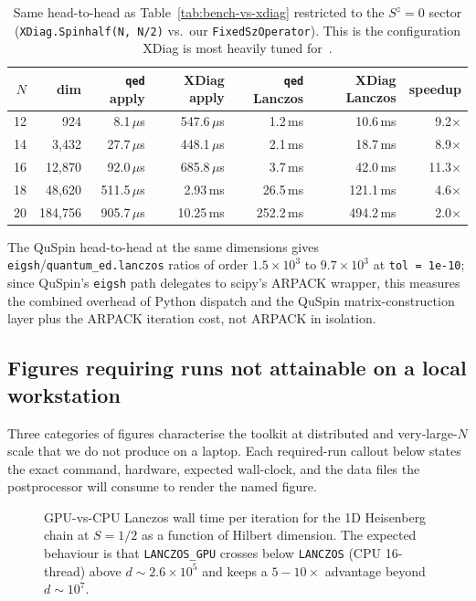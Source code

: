 \documentclass[submission, PhysCodeb]{SciPost}
\newcommand{\figureplaceholder}[2][0.85\textwidth]{%
  \begin{center}%
    \tikz[baseline]{
      \node[
        draw=scipostphys,
        line width=0.6pt,
        rounded corners=2pt,
        minimum width=#1,
        minimum height=0.5\textwidth,
        align=center,
        fill=lstbg,
      ] {\textcolor{scipostphys}{\textit{#2}}};
    }%
  \end{center}%
}
\begin{document}
\begin{table}[t]
\centering
\caption{Same head-to-head as Table~\ref{tab:bench-vs-xdiag}
restricted to the $S^z=0$ sector
(\texttt{XDiag.Spinhalf(N, N/2)} vs.~our \texttt{FixedSzOperator}).
This is the configuration XDiag is most heavily tuned
for~\cite{Wietek2025XDiag}.}
\label{tab:bench-vs-xdiag-fixedsz}
\small
\begin{tabular}{rrrrrrr}
\toprule
$N$ & dim     & \texttt{qed} apply & XDiag apply &
\texttt{qed} Lanczos & XDiag Lanczos & speedup \\
\midrule
12  & 924      & 8.1\,$\mu$s   & 547.6\,$\mu$s & 1.2\,ms   & 10.6\,ms  & 9.2$\times$  \\
14  & 3{,}432  & 27.7\,$\mu$s  & 448.1\,$\mu$s & 2.1\,ms   & 18.7\,ms  & 8.9$\times$  \\
16  & 12{,}870 & 92.0\,$\mu$s  & 685.8\,$\mu$s & 3.7\,ms   & 42.0\,ms  & 11.3$\times$ \\
18  & 48{,}620 & 511.5\,$\mu$s & 2.93\,ms      & 26.5\,ms  & 121.1\,ms & 4.6$\times$  \\
20  & 184{,}756& 905.7\,$\mu$s & 10.25\,ms     & 252.2\,ms & 494.2\,ms & 2.0$\times$  \\
\bottomrule
\end{tabular}
\end{table}

The QuSpin head-to-head at the same dimensions gives
\texttt{eigsh}/\texttt{quantum\_ed.lanczos} ratios of order
$1.5\!\times\!10^3$ to $9.7\!\times\!10^3$ at \texttt{tol = 1e-10};
since QuSpin's \texttt{eigsh} path delegates to scipy's ARPACK
wrapper, this measures the combined overhead of Python dispatch and
the QuSpin matrix-construction layer plus the ARPACK iteration cost,
not ARPACK in isolation.

\subsection{Figures requiring runs not attainable on a local workstation}
\label{sec:val-required}

Three categories of figures characterise the toolkit at distributed
and very-large-$N$ scale that we do not produce on a laptop. Each
required-run callout below states the exact command, hardware,
expected wall-clock, and the data files the postprocessor will
consume to render the named figure.

\begin{figure}[t]
\centering
\figureplaceholder[\textwidth]{Figure~\ref{fig:gpu-cpu-crossover}: GPU-vs-CPU Lanczos crossover}
\caption{GPU-vs-CPU Lanczos wall time per iteration for the 1D
Heisenberg chain at $S=1/2$ as a function of Hilbert dimension. The
expected behaviour is that \texttt{LANCZOS\_GPU} crosses below
\texttt{LANCZOS} (CPU 16-thread) above $d \sim 2.6 \times 10^5$ and
keeps a $5\!-\!10\times$ advantage beyond $d \sim 10^7$.}
\label{fig:gpu-cpu-crossover}
\end{figure}
\end{document}
